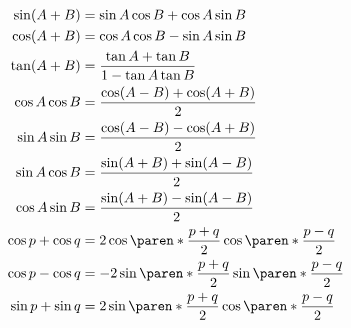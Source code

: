 \begin{frame}
  \vspace{-3.ex}
  \begin{align*}
    \sin (A + B)      & = \sin A \cos B + \cos A \sin B                                                      \\
    \cos (A + B)      & = \cos A \cos B - \sin A \sin B                                                      \\
    \tan (A + B)      & = \frac{\tan A + \tan B}{1 - \tan A \tan B}                                          \\
    \cos A \cos B     & =\frac{\cos(A-B)+\cos(A+B)}2\\
    \sin A \sin B     & =\frac{\cos(A-B)-\cos(A+B)}2\\
    \sin A \cos B     & =\frac{\sin(A+B)+\sin(A-B)}2                                                        \\
    \cos A \sin B     & =\frac{\sin(A+B)-\sin(A-B)}2                                                         \\
    \cos p + \cos q   & = 2 \cos \paren*{ \frac{p+q} 2 } \cos \paren*{ \frac{p-q} 2 }                        \\
    \cos p - \cos q   & = -2 \sin \paren*{ \frac{p+q} 2 } \sin \paren*{ \frac{p-q} 2 }                       \\
    \sin p + \sin q   & = 2 \sin \paren*{ \frac{p+q} 2 } \cos \paren*{ \frac{p-q} 2 }
  \end{align*}
\end{frame}
